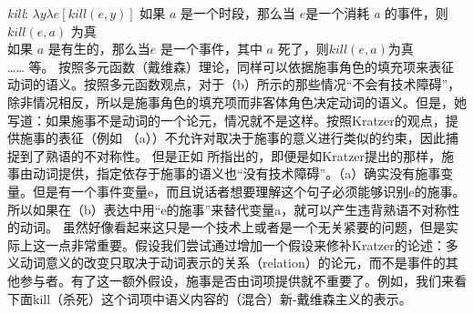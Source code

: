 \eal
\ex \emph{kill}: $\lambda y\lambda e[kill(e, y)]$ 
\ex 如果 $a$ 是一个时段，那么当 $e$是一个消耗 \emph{a} 的事件，则 $kill(e, a)$ 为真 \\
如果 $a$ 是有生的，那么当$e$ 是一个事件，其中 $a$ 死了，则$kill(e, a) $为真  \\
……{} 等。
\zl
按照多元函数（戴维森）理论，同样可以依据施事角色的填充项来表征动词的语义。按照多元函数观点，对于（b）所示的那些情况“不会有技术障碍”\citep[]{Kratzer96a}，除非情况相反，所以是施事角色的填充项而非客体角色决定动词的语义。但是，她写道：如果施事不是动词的一个论元，情况就不是这样。按照Kratzer的观点，提供施事的表征（例如 （a））不允许对取决于施事的意义进行类似的约束，因此捕捉到了熟语的不对称性。
    但是正如 \citet{Wechsler2005a}所指出的，即便是如Kratzer提出的那样，施事由动词提供，指定依存于施事的语义也“没有技术障碍”。（a）确实没有施事变量。但是有一个事件变量e，而且说话者想要理解这个句子必须能够识别e的施事。所以如果在（b）表达中用“e的施事”来替代变量a，就可以产生违背熟语不对称性的动词。
虽然好像看起来这只是一个技术上或者是一个无关紧要的问题，但是实际上这一点非常重要。假设我们尝试通过增加一个假设来修补Kratzer的论述：多义动词意义的改变只取决于动词表示的关系（relation）的论元，而不是事件的其他参与者。有了这一额外假设，施事是否由词项提供就不重要了。例如，我们来看下面kill（杀死）这个词项中语义内容的（混合）新-戴维森主义的表示。
